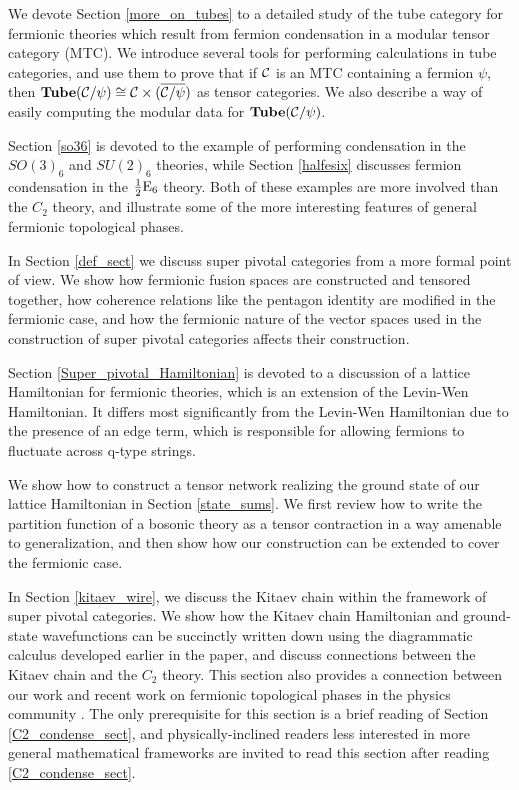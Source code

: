 We devote Section \ref{more_on_tubes} to a detailed study of the tube category 
for fermionic theories which result from fermion condensation in a modular tensor category (MTC). 
We introduce several tools for performing calculations in tube categories, 
and use them to prove that if $\mathcal{C}$ is an MTC containing a fermion $\psi$, then
$\textbf{Tube}(\mathcal{C}/\psi)\cong \mathcal{C}\times (\overline{\mathcal{C}/\psi})$ as tensor 
categories. We also describe a way of easily computing the modular data for 
$\textbf{Tube}(\mathcal{C}/\psi)$. 

Section \ref{so36} is devoted to the example of performing condensation in the $SO(3)_6$ 
and $SU(2)_6$ theories, while Section \ref{halfesix} discusses fermion condensation in the $
\frac{1}{2}\text{E}_6$ theory. 
Both of these examples are more involved than the $C_2$ theory, 
and illustrate some of the more interesting features of general fermionic topological phases. 

In Section \ref{def_sect} we discuss super pivotal categories from a more formal point of view. 
We show how fermionic fusion spaces are constructed and tensored together, how 
coherence relations like the pentagon identity are modified in the fermionic case, 
and how the fermionic nature of the vector spaces used in the construction of super 
pivotal categories affects their construction. 

Section \ref{Super_pivotal_Hamiltonian} is devoted to a discussion of a lattice Hamiltonian for fermionic theories, which is an extension of the Levin-Wen Hamiltonian. 
It differs most significantly from the Levin-Wen Hamiltonian due to the presence of an edge term, which 
is responsible for allowing fermions to fluctuate across q-type strings.

We show how to construct a tensor network realizing the ground state of our lattice Hamiltonian 
in Section \ref{state_sums}. We first review how to write the partition function of a bosonic theory 
as a tensor contraction in a way amenable to generalization, and then show how our construction 
can be extended to cover the fermionic case. 

In Section \ref{kitaev_wire}, we discuss the Kitaev chain within the framework of super pivotal 
categories. 
We show how the Kitaev chain Hamiltonian and ground-state wavefunctions can be 
succinctly written down using the diagrammatic calculus developed earlier in the paper, and 
discuss connections between the Kitaev chain and the $C_2$ theory. 
This section also provides a connection between our work 
and recent work on fermionic topological phases in the physics community \cite{ware2016,tarantino2016,turzillo2016}. 
The only prerequisite for this section is a brief reading of Section \ref{C2_condense_sect}, and physically-inclined readers less interested in more general mathematical frameworks
are invited to read this section after reading \ref{C2_condense_sect}. 

